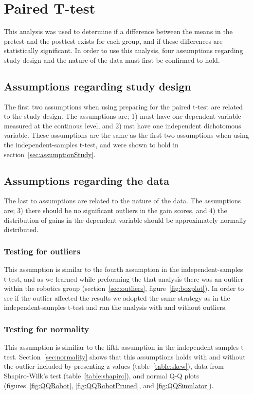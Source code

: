 \chapter{Paired T-test}\label{ch:pairedttest}
This analysis was used to determine if a difference between the means in the pretest and the posttest exists for each group, and if these differences are statistically significant. 
In order to use this analysis, four assumptions regarding study design and the nature of the data must first be confirmed to hold.

\section{Assumptions regarding study design}
The first two assumptions when using preparing for the paired t-test are related to the study design. The assumptions are;
1) must have one dependent variable measured at the continous level, and
2) mst have one independent dichotomous variable.
These assumptions are the same as the first two assumptions when using the independent-samples t-test, and were shown to hold in section~\ref{sec:assumptionStudy}. 

\section{Assumptions regarding the data}
The last to assumptions are related to the nature of the data. 
The assumptions are;
3) there should be no significant outliers in the gain scores, and
4) the distribution of gains in the dependent variable should be approximately normally distributed.

\subsection{Testing for outliers}
This assumption is similar to the fourth assumption in the independent-samples t-test, and as we learned while preforming the that analysis there was an outlier within the robotics group (section~\ref{sec:outliers}, figure~\ref{fig:boxplot}). In order to see if the outlier affected the results we adopted the same strategy as in the independent-samples t-test and ran the analysis with and without outliers.

\subsection{Testing for normality}
This assumption is similiar to the fifth assumption in the independent-samples t-test. Section~\ref{sec:normality} shows that this assumptions holds with and without the outlier included by presenting z-values (table~\ref{table:skew}), data from Shapiro-Wilk's test (table~\ref{table:shapiro}), and normal Q-Q plots (figures~\ref{fig:QQRobot}, \ref{fig:QQRobotPruned}, and \ref{fig:QQSimulator}).

